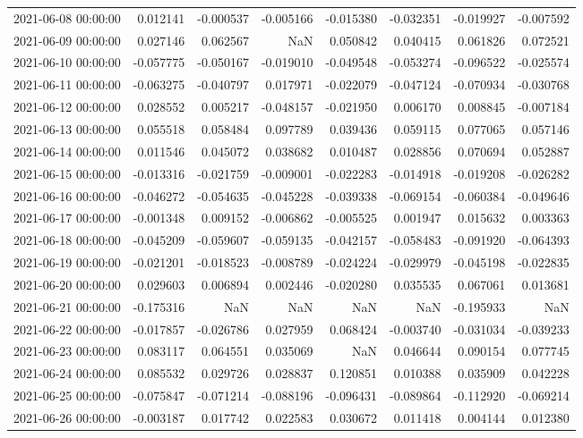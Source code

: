 \begin{tabular}{lrrrrrrr}
2021-06-08 00:00:00 & 0.012141 & -0.000537 & -0.005166 & -0.015380 & -0.032351 & -0.019927 & -0.007592 \\
2021-06-09 00:00:00 & 0.027146 & 0.062567 & NaN & 0.050842 & 0.040415 & 0.061826 & 0.072521 \\
2021-06-10 00:00:00 & -0.057775 & -0.050167 & -0.019010 & -0.049548 & -0.053274 & -0.096522 & -0.025574 \\
2021-06-11 00:00:00 & -0.063275 & -0.040797 & 0.017971 & -0.022079 & -0.047124 & -0.070934 & -0.030768 \\
2021-06-12 00:00:00 & 0.028552 & 0.005217 & -0.048157 & -0.021950 & 0.006170 & 0.008845 & -0.007184 \\
2021-06-13 00:00:00 & 0.055518 & 0.058484 & 0.097789 & 0.039436 & 0.059115 & 0.077065 & 0.057146 \\
2021-06-14 00:00:00 & 0.011546 & 0.045072 & 0.038682 & 0.010487 & 0.028856 & 0.070694 & 0.052887 \\
2021-06-15 00:00:00 & -0.013316 & -0.021759 & -0.009001 & -0.022283 & -0.014918 & -0.019208 & -0.026282 \\
2021-06-16 00:00:00 & -0.046272 & -0.054635 & -0.045228 & -0.039338 & -0.069154 & -0.060384 & -0.049646 \\
2021-06-17 00:00:00 & -0.001348 & 0.009152 & -0.006862 & -0.005525 & 0.001947 & 0.015632 & 0.003363 \\
2021-06-18 00:00:00 & -0.045209 & -0.059607 & -0.059135 & -0.042157 & -0.058483 & -0.091920 & -0.064393 \\
2021-06-19 00:00:00 & -0.021201 & -0.018523 & -0.008789 & -0.024224 & -0.029979 & -0.045198 & -0.022835 \\
2021-06-20 00:00:00 & 0.029603 & 0.006894 & 0.002446 & -0.020280 & 0.035535 & 0.067061 & 0.013681 \\
2021-06-21 00:00:00 & -0.175316 & NaN & NaN & NaN & NaN & -0.195933 & NaN \\
2021-06-22 00:00:00 & -0.017857 & -0.026786 & 0.027959 & 0.068424 & -0.003740 & -0.031034 & -0.039233 \\
2021-06-23 00:00:00 & 0.083117 & 0.064551 & 0.035069 & NaN & 0.046644 & 0.090154 & 0.077745 \\
2021-06-24 00:00:00 & 0.085532 & 0.029726 & 0.028837 & 0.120851 & 0.010388 & 0.035909 & 0.042228 \\
2021-06-25 00:00:00 & -0.075847 & -0.071214 & -0.088196 & -0.096431 & -0.089864 & -0.112920 & -0.069214 \\
2021-06-26 00:00:00 & -0.003187 & 0.017742 & 0.022583 & 0.030672 & 0.011418 & 0.004144 & 0.012380 \\

\end{tabular}
